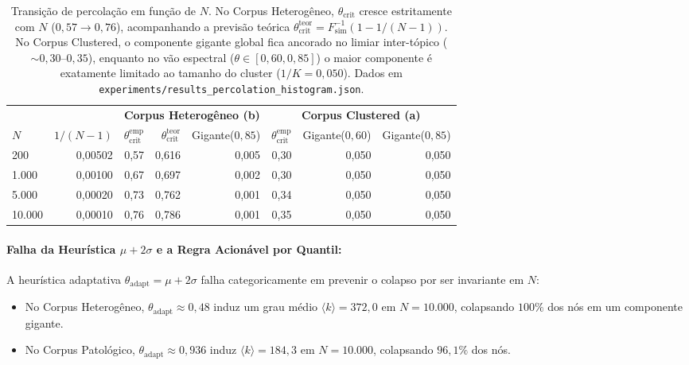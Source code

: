 \documentclass[11pt,a4paper]{article}
\theoremstyle{definition}
\begin{document}
\begin{table}[h]
\centering
\small
\begin{tabular}{lrrrrrrr}
\toprule
& & \multicolumn{3}{c}{\textbf{Corpus Heterog\^eneo (b)}} & \multicolumn{3}{c}{\textbf{Corpus Clustered (a)}} \\
\cmidrule(lr){3-5} \cmidrule(lr){6-8}
$N$ & $1/(N-1)$ & $\theta_{\mathrm{crit}}^{\mathrm{emp}}$ & $\theta_{\mathrm{crit}}^{\mathrm{teor}}$ & Gigante($0{,}85$) & $\theta_{\mathrm{crit}}^{\mathrm{emp}}$ & Gigante($0{,}60$) & Gigante($0{,}85$) \\
\midrule
200 & 0,00502 & 0,57 & 0,616 & 0,005 & 0,30 & 0,050 & 0,050 \\
1.000 & 0,00100 & 0,67 & 0,697 & 0,002 & 0,30 & 0,050 & 0,050 \\
5.000 & 0,00020 & 0,73 & 0,762 & 0,001 & 0,34 & 0,050 & 0,050 \\
10.000 & 0,00010 & 0,76 & 0,786 & 0,001 & 0,35 & 0,050 & 0,050 \\
\bottomrule
\end{tabular}
\caption{Transi\c{c}\~ao de percola\c{c}\~ao em fun\c{c}\~ao de $N$. No Corpus Heterog\^eneo, $\theta_{\mathrm{crit}}$ cresce estritamente com $N$ ($0{,}57 \to 0{,}76$), acompanhando a previs\~ao te\'orica $\theta_{\mathrm{crit}}^{\mathrm{teor}} = F_{\mathrm{sim}}^{-1}(1 - 1/(N-1))$. No Corpus Clustered, o componente gigante global fica ancorado no limiar inter-t\'opico ($\sim 0{,}30$--$0{,}35$), enquanto no v\~ao espectral ($\theta \in [0{,}60, 0{,}85]$) o maior componente \'e exatamente limitado ao tamanho do cluster ($1/K = 0{,}050$). Dados em \texttt{experiments/results\_percolation\_histogram.json}.}
\label{tab:percolation_sweep}
\end{table}

\paragraph{Falha da Heur\'istica $\mu + 2\sigma$ e a Regra Acion\'avel por Quantil:}
A heur\'istica adaptativa $\theta_{\mathrm{adapt}} = \mu + 2\sigma$ falha categoricamente em prevenir o colapso por ser invariante em $N$:
\begin{itemize}
    \item No Corpus Heterog\^eneo, $\theta_{\mathrm{adapt}} \approx 0{,}48$ induz um grau m\'edio $\langle k \rangle = 372{,}0$ em $N = 10.000$, colapsando $100\%$ dos n\'os em um componente gigante.
    \item No Corpus Patol\'ogico, $\theta_{\mathrm{adapt}} \approx 0{,}936$ induz $\langle k \rangle = 184{,}3$ em $N = 10.000$, colapsando $96{,}1\%$ dos n\'os.
\end{itemize}
\end{document}
